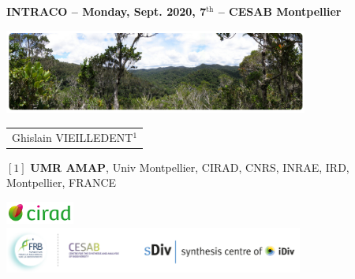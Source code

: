 {

  \begin{frame}
    \begin{center}
        \small{\textbf{INTRACO -- Monday, Sept. 2020, 7$^{\text{th}}$ -- CESAB Montpellier}}
    \end{center}
    \vspace{-0.25cm}
    \titlepage %
    \vspace{-2.5cm}
    \begin{center}
      \includegraphics[width=10cm]{figs/Banniere.png}
    \end{center}
    \vspace{0.2cm}
    \begin{center}

        \begin{tabular}{c}
          Ghislain \uppercase{Vieilledent}$^{1}$
        \end{tabular}

      \vspace{0.1cm}

      {\small
      $[1]$ \textbf{UMR AMAP}, Univ Montpellier, CIRAD, CNRS, INRAE, IRD, Montpellier, FRANCE
      }
      
      \vspace{0.1cm}
      
      \includegraphics[height=0.75cm]{figs/Logo-Cirad}\\

      \includegraphics[height=1.5cm]{figs/logos-FRB-Cesab-iDiv-sDiv}

    \end{center}
    
  \end{frame}
}
\setcounter{framenumber}{0}

